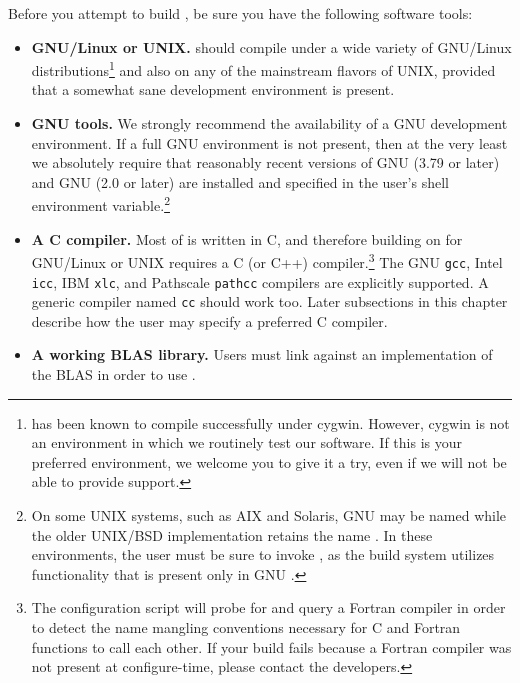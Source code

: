Before you attempt to build \libflamens, be sure you have the following
software tools:
\begin{itemize}
\item
{\bf GNU/Linux or UNIX.}
\libflame should compile under a wide variety of GNU/Linux
distributions\footnote{\libflame has been known to compile successfully under
cygwin.
However, cygwin is not an environment in which we routinely test our software.
If this is your preferred environment, we welcome you to give it a try,
even if we will not be able to provide support.}
and also on any of the mainstream flavors of UNIX, provided that a somewhat
sane development environment is present.
\item
{\bf GNU tools.}
We strongly recommend the availability of a GNU development
environment.
If a full GNU environment is not present, then at the very least we
absolutely require that reasonably recent versions of GNU \make
(3.79 or later) and GNU \bash (2.0 or later) are installed and
specified in the user's \PATH shell environment variable.\footnote{On
some UNIX systems, such as AIX and Solaris, GNU \make may be named
\gmake while the older UNIX/BSD implementation retains the name \makens.
In these environments, the user must be sure to invoke \gmakens, as the
\libflame build system utilizes functionality that is present only in GNU
\makens.}
\item
{\bf A C compiler.}
Most of \libflame is written in C, and therefore building \libflame on for
GNU/Linux or UNIX requires a C (or C++) compiler.\footnote{
The \libflame configuration script will probe for and query a Fortran compiler
in order to detect the name mangling conventions necessary for
C and Fortran functions to call each other.
If your build fails because a Fortran compiler was not present at
configure-time, please contact the \libflame developers.}
The GNU {\tt gcc}, Intel {\tt icc}, IBM {\tt xlc}, and Pathscale {\tt pathcc}
compilers are explicitly supported.
A generic compiler named {\tt cc} should work too.
Later subsections in this chapter describe how the user may specify a preferred
C compiler.
\item
{\bf A working BLAS library.}
Users must link against an implementation of the BLAS in order
to use \libflamens.

\end{itemize}
